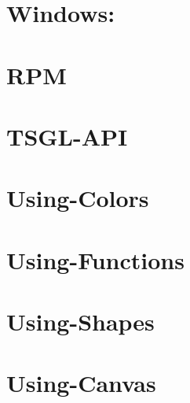 \documentclass[twoside]{book}
\begin{document}
\chapter{Windows\-:}
\label{md__home_kodemonkey_workspace__t_s_g_l_docs-wiki__library-_versions}
\hypertarget{md__home_kodemonkey_workspace__t_s_g_l_docs-wiki__library-_versions}{}

\chapter{R\-P\-M}
\label{md__home_kodemonkey_workspace__t_s_g_l_docs-wiki__r_p_m}
\hypertarget{md__home_kodemonkey_workspace__t_s_g_l_docs-wiki__r_p_m}{}

\chapter{T\-S\-G\-L-\/\-A\-P\-I}
\label{md__home_kodemonkey_workspace__t_s_g_l_docs-wiki__t_s_g_l-_a_p_i}
\hypertarget{md__home_kodemonkey_workspace__t_s_g_l_docs-wiki__t_s_g_l-_a_p_i}{}

\chapter{Using-\/\-Colors}
\label{md__home_kodemonkey_workspace__t_s_g_l_docs-wiki_tutorials__using-_colors}
\hypertarget{md__home_kodemonkey_workspace__t_s_g_l_docs-wiki_tutorials__using-_colors}{}

\chapter{Using-\/\-Functions}
\label{md__home_kodemonkey_workspace__t_s_g_l_docs-wiki_tutorials__using-_functions}
\hypertarget{md__home_kodemonkey_workspace__t_s_g_l_docs-wiki_tutorials__using-_functions}{}

\chapter{Using-\/\-Shapes}
\label{md__home_kodemonkey_workspace__t_s_g_l_docs-wiki_tutorials__using-_shapes}
\hypertarget{md__home_kodemonkey_workspace__t_s_g_l_docs-wiki_tutorials__using-_shapes}{}

\chapter{Using-\/\-Canvas}
\label{md__home_kodemonkey_workspace__t_s_g_l_docs-wiki__using-_canvas}
\hypertarget{md__home_kodemonkey_workspace__t_s_g_l_docs-wiki__using-_canvas}{}

\end{document}
